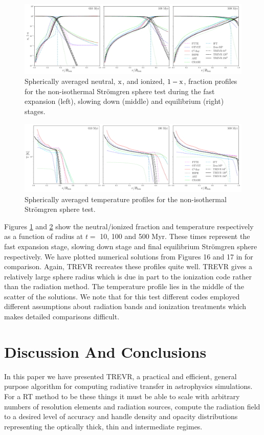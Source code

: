 \documentclass[fleq,usenatbib]{mnras}
\newcommand{\acro}{TREVR}
\newcommand{\strom}{Str\"omgren}
\begin{document}
{\begin{figure}
\includegraphics[width=0.95\linewidth]{Figures/strom_fraction.pdf}
\caption{Spherically averaged neutral, $\rm x$, and ionized, $\rm 1-x$, 
fraction profiles for the non-isothermal \strom{} sphere test during the fast 
expansion (left), slowing down (middle) and equilibrium (right) stages.}
\label{fig:stromtherm}
\end{figure}
\begin{figure}
\includegraphics[width=0.95\linewidth]{Figures/strom_temp.pdf}
\caption{Spherically averaged temperature profiles for the non-isothermal 
\strom{} sphere test.}
\label{fig:stromtemp}
\end{figure}
Figures \ref{fig:stromtherm} and \ref{fig:stromtemp} show the neutral/ionized 
fraction and temperature respectively as a function of radius at $t=$ 10, 100
and 500 Myr. These times represent the fast expansion stage, slowing down 
stage and final equilibrium \strom{} sphere respectively. We have plotted 
numerical solutions from Figures 16 and 17 in \cite{ilievEt06} for comparison. 
Again, \acro{} recreates these profiles quite well.
\acro{} gives a relatively large sphere radius which is 
due in part to the ionization code rather than the radiation method.  
The temperature profile lies in the middle of the scatter of the 
\cite{ilievEt06} solutions.  We note that for this test different codes employed
different assumptions about radiation bands and ionization treatments which
makes detailed comparisons difficult.

\section{Discussion And Conclusions}\label{sec:disc}
In this paper we have presented \acro{}, a practical and efficient, general 
purpose algorithm for computing radiative transfer in astrophysics 
simulations. For a RT method to be these things it must be able to scale with 
arbitrary numbers of resolution elements and radiation sources, compute the 
radiation field to a desired level of accuracy and handle density and opacity 
distributions representing the optically thick, thin and intermediate regimes.

}
\end{document}
